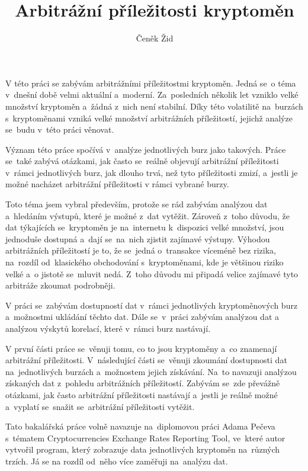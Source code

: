 \documentclass[thesis=B,czech]{FITthesis}[2019/03/21]
\title{Arbitrážní příležitosti kryptoměn}
\author{Čeněk Žid} %
\begin{document}

\begin{introduction}
V této práci se zabývám arbitrážními příležitostmi kryptoměn. Jedná se~o téma v~dnešní době velmi aktuální a~moderní. Za~posledních několik let vzniklo velké množství kryptoměn a~žádná z~nich není stabilní. Díky této volatilitě na~burzách s~kryptoměnami vzniká velké množství arbitrážních příležitostí, jejichž analýze se~budu v~této práci věnovat.

Význam této práce spočívá v~analýze jednotlivých burz jako takových. Práce se~také zabývá otázkami, jak často se~reálně objevují arbitrážní \linebreak příležitosti v~rámci jednotlivých burz, jak dlouho trvá, než tyto příležitosti zmizí, a~jestli je možné nacházet arbitrážní příležitosti v rámci vybrané burzy.

Toto téma jsem vybral především, protože se rád zabývám analýzou dat a~hledáním výstupů, které je možné z~dat vytěžit. Zároveň z~toho důvodu, že dat týkajících se~kryptoměn je na~internetu k~dispozici velké množství, jsou jednoduše dostupná a~dají se~na~nich zjistit zajímavé výstupy. Výhodou arbitrážních příležitostí je to, že se~jedná o~transakce víceméně bez rizika, na~rozdíl od~klasického obchodování s~kryptoměnami, kde je většinou riziko velké a~o jistotě se~mluvit nedá. Z~toho důvodu mi připadá velice zajímavé tyto arbitráže zkoumat podrobněji. 

V práci se~zabývám dostupností dat v~rámci jednotlivých kryptoměnových burz a~možnostmi ukládání těchto dat. Dále se~v~práci zabývám analýzou dat a analýzou výskytů korelací, které v~rámci burz nastávají.

V první části práce se~věnuji tomu, co to jsou kryptoměny a~co znamenají arbitrážní příležitosti. V~následující části se~věnuji zkoumání dostupnosti dat na~jednotlivých burzách a~možnostem jejich získávání. Na~to navazuji analýzou získaných dat z~pohledu arbitrážních příležitostí. Zabývám se~zde převážně otázkami, jak často arbitrážní příležitosti nastávají a~jestli je reálně možné a~vyplatí se~snažit se~arbitrážní příležitosti vytěžit.

Tato bakalářská práce volně navazuje na~diplomovou práci Adama Pečeva s~tématem Cryptocurrencies Exchange Rates Reporting Tool, ve~které autor vytvořil program, který zobrazuje data jednotlivých kryptoměn na~různých trzích. Já se na rozdíl od~něho více zaměřuji na~analýzu dat.
\end{introduction}
\end{document}
